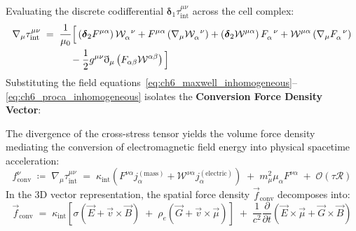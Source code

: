 \documentclass[
    12pt,
    a4paper,
    headings=normal,
    twoside=false,
    open=any,
    parskip=half
]{scrbook}
\newcommand{\ethop}{\eth}
\begin{document}
Evaluating the discrete codifferential $\boldsymbol{\delta}_1 \tau_{\text{int}}^{\mu\nu}$ across the cell complex:
\begin{align}
\nabla_\mu \tau_{\text{int}}^{\mu\nu} &\;=\; \frac{1}{\mu_0} \Big[ \left(\boldsymbol{\delta}_2 F^{\mu\alpha}\right) \mathcal{W}_\alpha^{\phantom{\alpha}\nu} + F^{\mu\alpha} \left(\nabla_\mu \mathcal{W}_\alpha^{\phantom{\alpha}\nu}\right) + \left(\boldsymbol{\delta}_2 \mathcal{W}^{\mu\alpha}\right) F_\alpha^{\phantom{\alpha}\nu} + \mathcal{W}^{\mu\alpha} \left(\nabla_\mu F_\alpha^{\phantom{\alpha}\nu}\right) \notag \\
&\qquad\quad - \frac{1}{2} g^{\mu\nu} \ethop_\mu \left( F_{\alpha\beta}\mathcal{W}^{\alpha\beta} \right) \Big]
\end{align}
Substituting the field equations~\eqref{eq:ch6_maxwell_inhomogeneous}--\eqref{eq:ch6_proca_inhomogeneous} isolates the \textbf{Conversion Force Density Vector}:

\begin{phystheorem}\label{thm:ch6_conversion_force_density}
The divergence of the cross-stress tensor yields the volume force density mediating the conversion of electromagnetic field energy into physical spacetime acceleration:
\begin{equation}
f_{\text{conv}}^\nu \;\coloneqq\; \nabla_\mu \tau_{\text{int}}^{\mu\nu} \;=\; \kappa_{\text{int}} \left( F^{\nu\alpha} j_\alpha^{(\text{mass})} + \mathcal{W}^{\nu\alpha} j_\alpha^{(\text{electric})} \right) \;+\; m_\mu^2 \mu_\alpha F^{\nu\alpha} \;+\; \mathcal{O}(\tau \mathcal{R})
\label{eq:ch6_conversion_force_density_master}
\end{equation}
In the 3D vector representation, the spatial force density $\vec{f}_{\text{conv}}$ decomposes into:
\begin{equation}
\vec{f}_{\text{conv}} \;=\; \kappa_{\text{int}} \left[ \sigma \left( \vec{E} + \vec{v} \times \vec{B} \right) \;+\; \rho_e \left( \vec{G} + \vec{v} \times \vec{\mu} \right) \right] \;+\; \frac{1}{c^2} \frac{\partial}{\partial t}\left( \vec{E} \times \vec{\mu} + \vec{G} \times \vec{B} \right)
\label{eq:ch6_3d_vector_force_density}
\end{equation}
\end{phystheorem}
\end{document}
